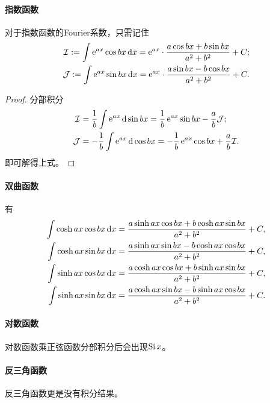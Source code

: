 \paragraph{指数函数}
对于指数函数的Fourier系数，只需记住
\begin{subequations}
	\label{eq:mmp-exponential-trigonometric-primitives}
	\begin{align}
		\mathcal I := \int\mathop{}\!\mathrm{e}^{ax}\cos bx\mathop{}\!\mathrm{d} x = \mathop{}\!\mathrm{e}^{ax} \cdot \frac{a\cos bx + b\sin bx}{a^2 + b^2} + C;\\
		\mathcal J := \int\mathop{}\!\mathrm{e}^{ax}\sin bx\mathop{}\!\mathrm{d} x = \mathop{}\!\mathrm{e}^{ax} \cdot \frac{a\sin bx - b\cos bx}{a^2 + b^2} + C.
	\end{align}
\end{subequations}
\begin{proof}
	分部积分
	\begin{align*}
		\mathcal I &= \frac1b\int\mathop{}\!\mathrm{e}^{ax}\mathop{}\!\mathrm{d}\sin bx = \frac1b\mathop{}\!\mathrm{e}^{ax}\sin bx - \frac ab\mathcal J;\\
		\mathcal J &= -\frac1b\int\mathop{}\!\mathrm{e}^{ax}\mathop{}\!\mathrm{d}\cos bx = -\frac1b\mathop{}\!\mathrm{e}^{ax}\cos bx + \frac ab\mathcal I.
	\end{align*}
	即可解得上式。
\end{proof}

\paragraph{双曲函数}
有
\begin{subequations}
	\label{eq:mmp-hyperbolic-trigonometric-primitives}
	\begin{align}
		\int\cosh ax\cos bx\mathop{}\!\mathrm{d} x = \frac{a\sinh ax\cos bx + b\cosh ax\sin bx}{a^2 + b^2} + C,\\
		\int\cosh ax\sin bx\mathop{}\!\mathrm{d} x = \frac{a\sinh ax\sin bx - b\cosh ax\cos bx}{a^2 + b^2} + C,\\
		\int\sinh ax\cos bx\mathop{}\!\mathrm{d} x = \frac{a\cosh ax\cos bx + b\sinh ax\sin bx}{a^2 + b^2} + C,\\
		\int\sinh ax\sin bx\mathop{}\!\mathrm{d} x = \frac{a\cosh ax\sin bx - b\sinh ax\cos bx}{a^2 + b^2} + C.
	\end{align}
\end{subequations}

\paragraph{对数函数}
对数函数乘正弦函数分部积分后会出现$\operatorname{Si} x$。

\paragraph{反三角函数}
反三角函数更是没有积分结果。

